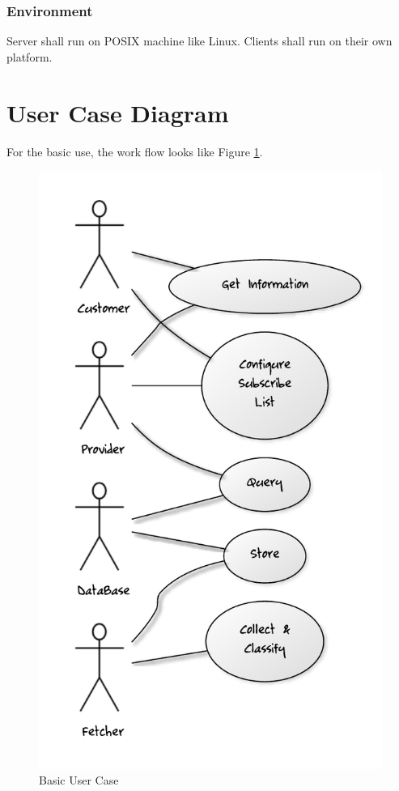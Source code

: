     \subsubsection{Environment}
      Server shall run on POSIX machine like Linux.
      Clients shall run on their own platform.

\section{User Case Diagram}
  For the basic use, the work flow looks like Figure \ref{user-case-diagram}.
  \begin{figure}[htbp]
  \includegraphics[]{./figure/basic}
  \caption{Basic User Case\label{user-case-diagram}}
  \end{figure}

